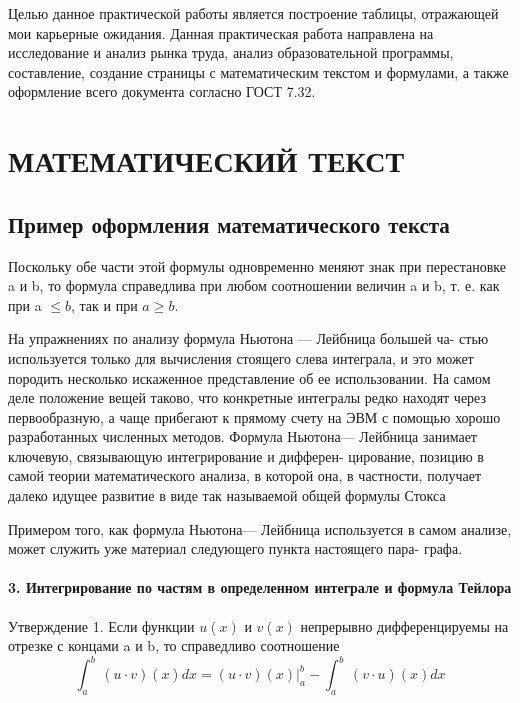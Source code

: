 \documentclass[14pt]{extreport}
\begin{document}
\pagestyle{empty} %


\pagestyle{plain} %
\tableofcontents
 



\intro\label{intro}



Целью данное практической работы является построение таблицы, отражающей мои карьерные ожидания. Данная практическая работа направлена на исследование и анализ рынка труда, анализ образовательной программы, составление, создание страницы с математическим текстом и формулами, а также оформление всего документа согласно ГОСТ 7.32.


\chapter{МАТЕМАТИЧЕСКИЙ ТЕКСТ\label{chapter1}}
\section{Пример оформления математического текста}

Поскольку обе части этой формулы одновременно меняют знак при перестановке a и b, то формула справедлива при любом соотношении величин a и b,
т. е. как при a $\leq b$, так и при $a \geq b$.

На упражнениях по анализу формула Ньютона — Лейбница большей ча-
стью используется только для вычисления стоящего слева интеграла, и это
может породить несколько искаженное представление об ее использовании.
На самом деле положение вещей таково, что конкретные интегралы редко
находят через первообразную, а чаще прибегают к прямому счету на ЭВМ
с помощью хорошо разработанных численных методов. Формула Ньютона—
Лейбница занимает ключевую, связывающую интегрирование и дифферен-
цирование, позицию в самой теории математического анализа, в которой
она, в частности, получает далеко идущее развитие в виде так называемой
общей формулы Стокса

Примером того, как формула Ньютона— Лейбница используется в самом
анализе, может служить уже материал следующего пункта настоящего пара-
графа.

\subsubsection{3. Интегрирование по частям в определенном интеграле и формула Тейлора}

Утверждение 1. Если функции $u(x)$ и $v(x)$ непрерывно дифференцируемы
на отрезке с концами a и b, то справедливо соотношение \\
\begin{equation}
\int_{a}^{b}  \,(u\cdot v)(x)dx=(u \cdot v)(x)| _a^b - \int_{a}^{b} \, (v \cdot u) (x) dx
\end{equation}
\end{document}
